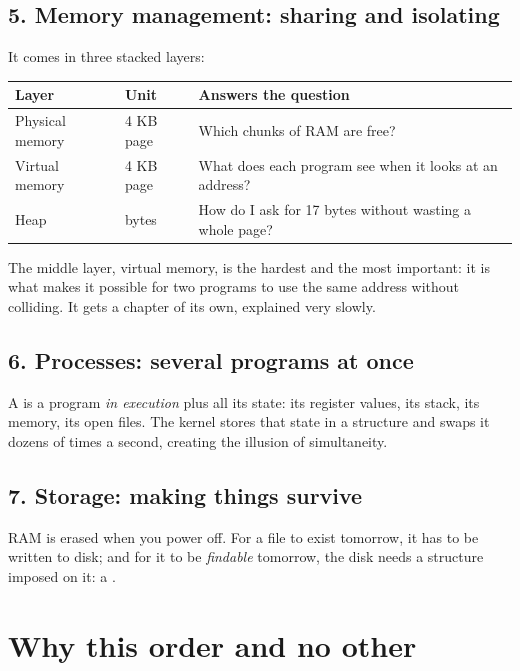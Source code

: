 \subsection{5. Memory management: sharing and isolating}

It comes in three stacked layers:

\begin{center}
\begin{tabularx}{\textwidth}{@{}l l X@{}}
\toprule
\textbf{Layer} & \textbf{Unit} & \textbf{Answers the question} \\
\midrule
Physical memory & 4 KB page & Which chunks of RAM are free? \\
Virtual memory  & 4 KB page & What does each program see when it looks at an address? \\
Heap            & bytes     & How do I ask for 17 bytes without wasting a whole page? \\
\bottomrule
\end{tabularx}
\end{center}

The middle layer, virtual memory, is the hardest and the most important: it is what makes it
possible for two programs to use the same address  without colliding. It gets a
chapter of its own, explained very slowly.

\subsection{6. Processes: several programs at once}

A  is a program \emph{in execution} plus all its state: its register values, its
stack, its memory, its open files. The kernel stores that state in a structure and swaps it dozens
of times a second, creating the illusion of simultaneity.

\subsection{7. Storage: making things survive}

RAM is erased when you power off. For a file to exist tomorrow, it has to be written to disk; and
for it to be \emph{findable} tomorrow, the disk needs a structure imposed on it: a
.

\section{Why this order and no other}

